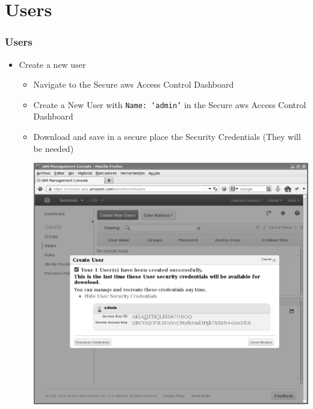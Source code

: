 \documentclass{beamer}
\begin{document}
\section{Users}
\begin{frame}[fragile]
\frametitle{Users}
\begin{itemize}
\item Create a new user
\begin{itemize}
 \item Navigate to the Secure \acrshort{aws} Access Control Dashboard 
 \item Create a New User with \texttt{Name: `admin'} in the Secure \acrshort{aws} Access Control Dashboard
 \item Download and save in a secure place the Security Credentials (They will be needed)
 \begin{center}
 \includegraphics[scale=0.10]{credentials.eps}
 \end{center}
\end{itemize}
\end{itemize}
\end{frame}
\end{document}
